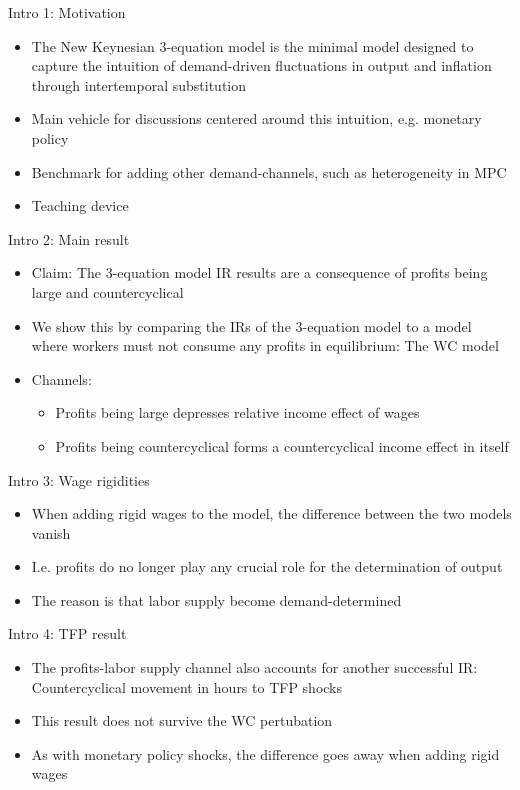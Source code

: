 \documentclass{beamer}
\newcommand{\bit}{\begin{itemize}}
\newcommand{\eit}{\end{itemize}}
\begin{document}
\begin{frame}{Intro 1: Motivation}

\bit
	\item The New Keynesian 3-equation model is the minimal model designed to capture the intuition of demand-driven fluctuations in output and inflation through intertemporal substitution
	\item Main vehicle for discussions centered around this intuition, e.g. monetary policy
	\item Benchmark for adding other demand-channels, such as heterogeneity in MPC
	\item Teaching device
\eit


\end{frame}


\begin{frame}{Intro 2: Main result}

\bit
	\item Claim: The 3-equation model IR results are a consequence of profits being large and countercyclical
	\item We show this by comparing the IRs of the 3-equation model to a model where workers must not consume any profits in equilibrium: The WC model
	\item Channels:
		\bit
			\item Profits being large depresses relative income effect of wages
			\item Profits being countercyclical forms a countercyclical income effect in itself
		\eit
\eit


\end{frame}

\begin{frame}{Intro 3: Wage rigidities}

\bit
	\item When adding rigid wages to the model, the difference between the two models vanish
	\item I.e. profits do no longer play any crucial role for the determination of output
	\item The reason is that labor supply become demand-determined
\eit


\end{frame}

\begin{frame}{Intro 4: TFP result}

\bit
	\item The profits-labor supply channel also accounts for another successful IR: Countercyclical movement in hours to TFP shocks
	\item This result does not survive the WC pertubation
	\item As with monetary policy shocks, the difference goes away when adding rigid wages 
\eit


\end{frame}
\end{document}
